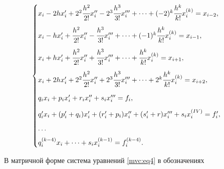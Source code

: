 \begin{equation}

\label{mvc:eq4}

\begin{cases}

  x_i-2 h x'_i+2^2 \cfrac{h^{2}}{2!} x_{i}''-2^3 \cfrac{h^{3}}{3!} x_{i}'''+\dots+(-2)^k\cfrac{h^k}{k!} x_i^{(k)}=x_{i-2},

\\[4mm]

  x_i-h x'_i+\cfrac{h^{2}}{2!} x_{i}''-\cfrac{h^{3}}{3!} x_{i}'''+\dots+(-1)^k\cfrac{h^k}{k!} x_i^{(k)}=x_{i-1},

\\[4mm]

  x_i+h x'_i+\cfrac{h^{2}}{2!} x_{i}''+\cfrac{h^{3}}{3!} x_{i}'''+\dots+\cfrac{h^k}{k!} x_i^{(k)}=x_{i+1},

\\[4mm]

  x_i+2 h x'_i+2^2 \cfrac{h^{2}}{2!} x_{i}''+2^3 \cfrac{h^{3}}{3!} x_{i}'''+\dots+2^k\cfrac{h^k}{k!} x_i^{(k)}=x_{i+2},

\\[4mm]

  q_i x_i+p_i x'_i+r_i x''_i+s_i x'''_i=f_i,

\\[3mm]

  q_i' x_i+(p_i'+q_i) x'_i+(r_i'+p_i) x''_i+(s_i'+r) x'''_i+s_i x_i^{(IV)}=f_i',

\\[2mm]

\dots

\\[2mm]

  q_i^{(k-4)} x_i+\dots+s_i x_i^{(k-1)}=f_i^{(k-4)}.

\end{cases}

\end{equation}



В матричной форме система уравнений \eqref{mvc:eq4}  в обозначениях



